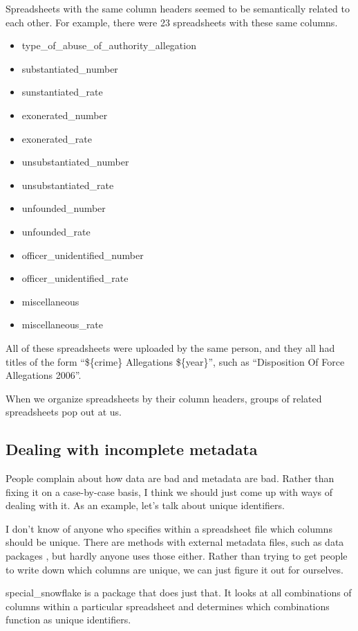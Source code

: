 \documentclass{acm_proc_article-sp}
\begin{document}
Spreadsheets with the same column headers seemed to be semantically related to
each other. For example, there were 23 spreadsheets with these same columns.
\begin{itemize}
\item type\_of\_abuse\_of\_authority\_allegation
\item substantiated\_number
\item sunstantiated\_rate
\item exonerated\_number
\item exonerated\_rate
\item unsubstantiated\_number
\item unsubstantiated\_rate
\item unfounded\_number
\item unfounded\_rate
\item officer\_unidentified\_number
\item officer\_unidentified\_rate
\item miscellaneous
\item miscellaneous\_rate
\end{itemize}

All of these spreadsheets were uploaded by the same person, and they all had
titles of the form ``\$\{crime\} Allegations \$\{year\}'', such as
``Disposition Of Force Allegations 2006''.

When we organize spreadsheets by their column headers, groups of related
spreadsheets pop out at us.

\subsection{Dealing with incomplete metadata}
People complain about how data are bad and metadata are bad. Rather than
fixing it on a case-by-case basis, I think we should just come up with ways
of dealing with it. As an example, let's talk about unique identifiers.

I don't know of anyone who specifies within a spreadsheet file which columns
should be unique. There are methods with external metadata files, such as data
packages \cite{datapackages}, but hardly anyone uses those either. Rather than
trying to get people to write down which columns are unique, we can just figure
it out for ourselves.

special\_snowflake \cite{specialsnowflake} is a package that does just that.
It looks at all combinations of columns within a particular spreadsheet and
determines which combinations function as unique identifiers.
\end{document}
